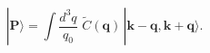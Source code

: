 \begin{equation}
|{\mathbf{P}}\rangle = \int \frac{d^3q}{q_0}\, \, \tilde{C}(\mathbf{q}) \,  
 |\mathbf{k - q, k + q} \rangle . 	\label{eq32}
\end{equation}

